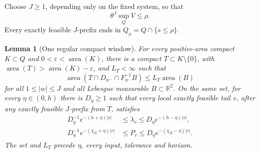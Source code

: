 \documentclass[11pt]{amsart}
\newtheorem{lemma}[theorem]{Lemma}
\theoremstyle{definition}
\theoremstyle{remark}
\newcommand{\R}{\mathbb R}
\newcommand{\area}{\operatorname{area}}
\numberwithin{equation}{section}
\begin{document}
Choose \(J\ge1\), depending only on the fixed system, so that
\begin{equation}\label{eq:localentry}
\theta^J\sup_Q V\le\rho .
\end{equation}
Every exactly feasible \(J\)-prefix ends in
\(Q_\rho=Q\cap\{s\le\rho\}\).

\begin{lemma}[One regular compact window]\label{lem:regularwindow}
For every positive-area compact \(K\subset Q\) and
\(0<\varepsilon<\area(K)\), there is a compact
\(T\subset K\setminus\{0\}\), with
\(\area(T)>\area(K)-\varepsilon\), and \(L_T<\infty\) such that
\begin{equation}\label{eq:finitecharts}
\area(T\cap D_{w^-}\cap F_w^{-1}B)\le L_T\area(B)
\end{equation}
for all \(1\le|w|\le J\) and all Lebesgue measurable
\(B\subset\R^2\).
On the same set, for every \(\eta\in(0,h)\) there is \(D_{\eta}\ge1\) such
that every local exactly feasible tail \(v\), after any exactly
feasible \(J\)-prefix from \(T\), satisfies
\begin{equation}\label{eq:typicalproducts}
\begin{split}
D_{\eta}^{-1}e^{-(h+\eta)|v|}&\le\lambda_v\le D_{\eta} e^{-(h-\eta)|v|},\\
D_{\eta}^{-1}e^{-(\chi_R+\eta)|v|}&\le P_v\le D_{\eta} e^{-(\chi_R-\eta)|v|}.
\end{split}
\end{equation}
The set and \(L_T\) precede \(\eta\), every input, tolerance and horizon.
\end{lemma}
\end{document}
